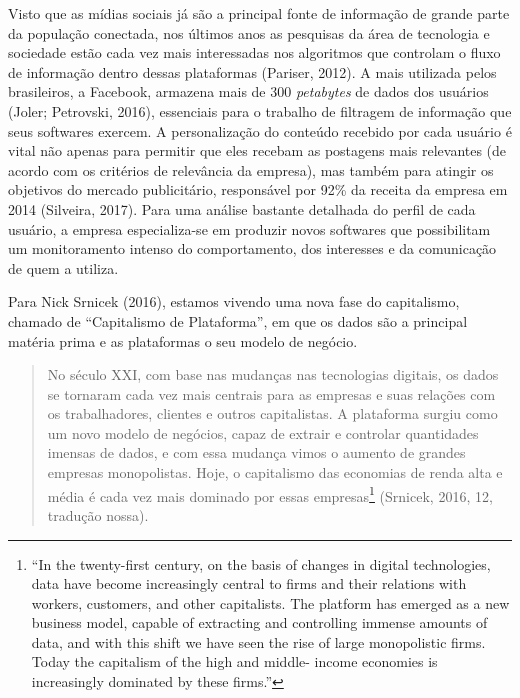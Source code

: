 Visto que as mídias sociais já são a principal fonte de informação de
grande parte da população conectada, nos últimos anos as pesquisas da
área de tecnologia e sociedade estão cada vez mais interessadas nos
algoritmos que controlam o fluxo de informação dentro dessas plataformas
(Pariser, 2012). A mais utilizada pelos brasileiros, a Facebook,
armazena mais de 300 \emph{petabytes} de dados dos usuários
(Joler; Petrovski, 2016), essenciais para o trabalho de filtragem de informação que seus softwares
exercem. A personalização do conteúdo recebido por cada usuário é vital
não apenas para permitir que eles recebam as postagens mais relevantes
(de acordo com os critérios de relevância da empresa), mas também para
atingir os objetivos do mercado publicitário, responsável por 92\% da
receita da empresa em 2014 (Silveira, 2017). Para uma análise bastante
detalhada do perfil de cada usuário, a empresa especializa-se em
produzir novos softwares que possibilitam um monitoramento intenso do
comportamento, dos interesses e da comunicação de quem a utiliza.

Para Nick Srnicek (2016), estamos vivendo uma nova fase do capitalismo,
chamado de ``Capitalismo de Plataforma'', em que os dados são a
principal matéria prima e as plataformas o seu modelo de negócio.

\begin{quote}
No século XXI, com base nas mudanças nas tecnologias digitais, os dados
se tornaram cada vez mais centrais para as empresas e suas relações com
os trabalhadores, clientes e outros capitalistas. A plataforma surgiu
como um novo modelo de negócios, capaz de extrair e controlar
quantidades imensas de dados, e com essa mudança vimos o aumento de
grandes empresas monopolistas. Hoje, o capitalismo das economias de
renda alta e média é cada vez mais dominado por essas empresas\footnote{``In
  the twenty-first century, on the basis of changes in digital
  technologies, data have become increasingly central to firms and their
  relations with workers, customers, and other capitalists. The platform
  has emerged as a new business model, capable of extracting and
  controlling immense amounts of data, and with this shift we have seen
  the rise of large monopolistic firms. Today the capitalism of the high
  and middle- income economies is increasingly dominated by these
  firms.''} (Srnicek, 2016, 12, tradução nossa).
\end{quote}

